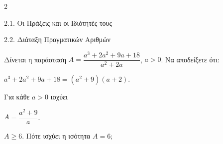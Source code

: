 \begin{ylh}{2}
    \item 2.1. Οι Πράξεις και οι Ιδιότητές τους
    \item 2.2. Διάταξη Πραγματικών Αριθμών
\end{ylh}
Δίνεται η παράσταση $A = \dfrac{a^3+2a^2+9a+18}{a^2+2a}$, $a > 0$. Να αποδείξετε ότι:

\begin{alist}
\item $a^3 + 2a^2 + 9a + 18 = (a^2 + 9)(a + 2)$.
\item Για κάθε $a > 0$ ισχύει

\end{alist}
\begin{alist}
\item
\begin{rlist}
\item $A = \dfrac{a^2+9}{a}$. 
\item $A \ge 6$. Πότε ισχύει η ισότητα $A = 6$; 
\end{rlist}
\end{alist}

